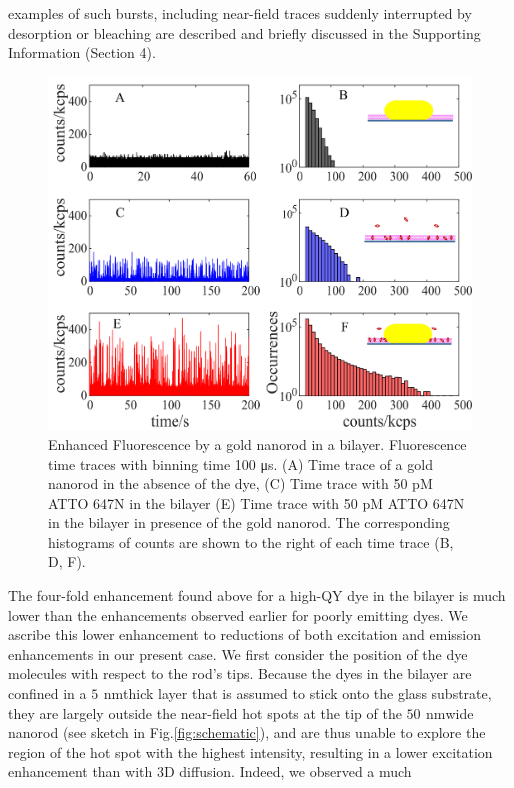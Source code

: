 \documentclass[journal=jpccck,manuscript=article]{achemso}
\newcommand{\nm}{\ensuremath{\,\textrm{nm}}}
\begin{document}
examples of such bursts, including near-field traces suddenly interrupted by desorption or bleaching are described and 
briefly discussed in the Supporting Information (Section 4).\\
\begin{figure}
	\centering
	\includegraphics[]{timetrace_hist.png}
	\caption{Enhanced Fluorescence by a gold nanorod in a bilayer. Fluorescence time traces with binning time 100 μs. 
	(A) Time trace of a gold nanorod in the absence of the dye, (C) Time trace with 50 pM ATTO 647N in the bilayer 
	(E) Time trace with 50 pM ATTO 647N in the bilayer in presence of the gold nanorod. The corresponding histograms 
	of counts are shown to the right of each time trace (B, D, F).}
	\label{fig:timetrace_hist}
\end{figure}
The four-fold enhancement found above for a high-QY dye in the bilayer is much lower than the enhancements observed 
earlier for poorly emitting dyes.\cite{yuan2013thousandfold} We ascribe this lower enhancement to reductions of both 
excitation and emission enhancements in our present case. We first consider the position of the dye molecules with 
respect to the rod’s tips. Because the dyes in the bilayer are confined in a $5~$\nm thick layer that is assumed to 
stick onto the glass substrate, they are largely outside the near-field hot spots at the tip of the $50~$\nm wide 
nanorod (see sketch in Fig.\ref{fig:schematic}), and are thus unable to explore the region of the hot spot with the 
highest intensity, resulting in a lower excitation enhancement than with 3D diffusion. Indeed, we observed a much 
\end{document}

